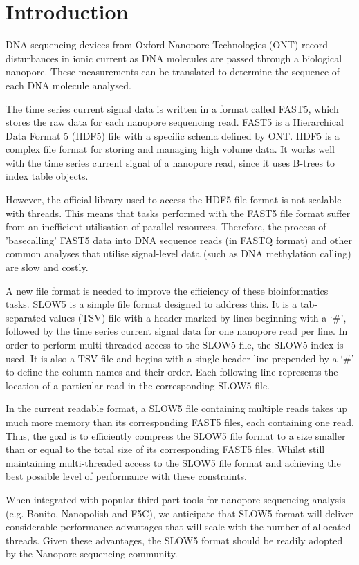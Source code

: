 \documentclass[a4paper, 12pt]{article}
\begin{document}
\section{Introduction}

DNA sequencing devices from Oxford Nanopore Technologies (ONT) record disturbances in ionic current as DNA molecules are passed through a biological nanopore. These measurements can be translated to determine the sequence of each DNA molecule analysed.

The time series current signal data is written in a format called FAST5, which stores the raw data for each nanopore sequencing read. FAST5 is a Hierarchical Data Format 5 (HDF5) file with a specific schema defined by ONT. HDF5 is a complex file format for storing and managing high volume data. It works well with the time series current signal of a nanopore read, since it uses B-trees to index table objects.

However, the official library used to access the HDF5 file format is not scalable with threads. This means that tasks performed with the FAST5 file format suffer from an inefficient utilisation of parallel resources. Therefore, the process of 'basecalling' FAST5 data into DNA sequence reads (in FASTQ format) and other common analyses that utilise signal-level data (such as DNA methylation calling) are slow and costly.

A new file format is needed to improve the efficiency of these bioinformatics tasks. SLOW5 is a simple file format designed to address this. It is a tab-separated values (TSV) file with a header marked by lines beginning with a `\#', followed by the time series current signal data for one nanopore read per line. In order to perform multi-threaded access to the SLOW5 file, the SLOW5 index is used. It is also a TSV file and begins with a single header line prepended by a `\#' to define the column names and their order. Each following line represents the location of a particular read in the corresponding SLOW5 file.

In the current readable format, a SLOW5 file containing multiple reads takes up much more memory than its corresponding FAST5 files, each containing one read. Thus, the goal is to efficiently compress the SLOW5 file format to a size smaller than or equal to the total size of its corresponding FAST5 files. Whilst still maintaining multi-threaded access to the SLOW5 file format and achieving the best possible level of performance with these constraints.

When integrated with popular third part tools for nanopore sequencing analysis (e.g. Bonito, Nanopolish and F5C), we anticipate that SLOW5 format will deliver considerable performance advantages that will scale with the number of allocated threads. Given these advantages, the SLOW5 format should be readily adopted by the Nanopore sequencing community.
\end{document}
